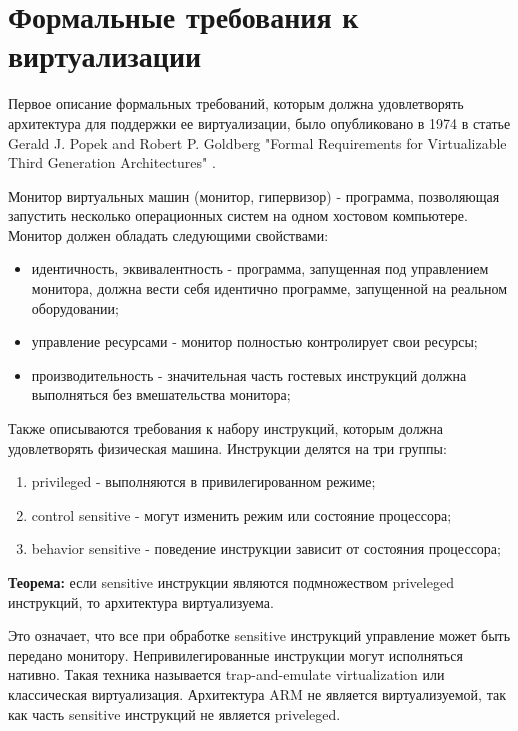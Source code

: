 \section{Формальные требования к виртуализации}
Первое описание формальных требований, которым должна удовлетворять архитектура для поддержки ее виртуализации, было опубликовано в 1974 в статье Gerald J. Popek and Robert P. Goldberg "Formal Requirements for Virtualizable Third Generation Architectures" \cite{bib:popek_goldberg}.

Монитор виртуальных машин (монитор, гипервизор) - программа, позволяющая запустить несколько операционных систем на одном хостовом компьютере. Монитор должен обладать следующими свойствами:

\begin{itemize}
    \item идентичность, эквивалентность - программа, запущенная под управлением монитора, должна вести себя идентично программе, запущенной на реальном оборудовании;
    \item управление ресурсами - монитор полностью контролирует свои ресурсы;
    \item производительность - значительная часть гостевых инструкций должна выполняться без вмешательства монитора;
\end{itemize}

Также описываются требования к набору инструкций, которым должна удовлетворять физическая машина. Инструкции делятся на три группы:

\begin{enumerate}
    \item privileged - выполняются в привилегированном режиме;
    \item control sensitive - могут изменить режим или состояние процессора;
    \item behavior sensitive - поведение инструкции зависит от состояния процессора;
\end{enumerate}

\textbf{Теорема: } если sensitive инструкции являются подмножеством priveleged инструкций, то архитектура виртуализуема.

Это означает, что все при обработке sensitive инструкций управление может быть передано монитору. Непривилегированные инструкции могут исполняться нативно. Такая техника называется trap-and-emulate virtualization или классическая виртуализация. Архитектура ARM не является виртуализуемой, так как часть sensitive инструкций не является priveleged.

